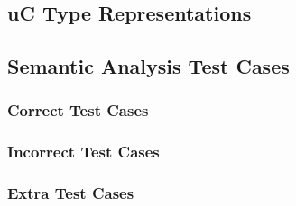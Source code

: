 \subsection{uC Type Representations}
\label{app:semantic/types_doc}



\clearpage

\subsection{Semantic Analysis Test Cases}
\label{app:semantic/testcases}

\subsubsection{Correct Test Cases}
\label{app:semantic/correct}




\clearpage %

\subsubsection{Incorrect Test Cases}
\label{app:semantic/incorrect}



\subsubsection{Extra Test Cases}
\label{app:semantic/extra}


